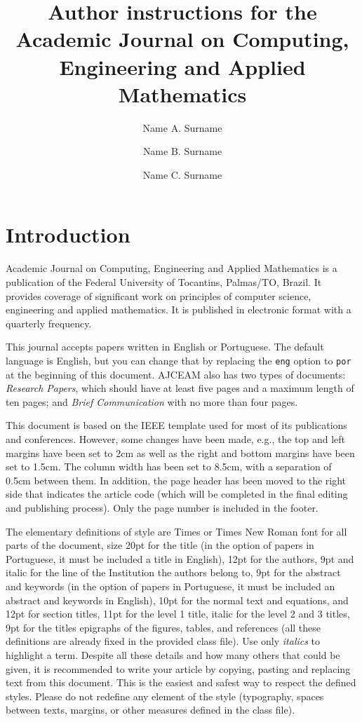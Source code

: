 \documentclass[eng]{ajceam-class}
\title{Author instructions for the Academic Journal on Computing, Engineering and Applied Mathematics}
\author[1]{Name A. Surname}
\author[2]{Name B. Surname}
\author[1,2,3]{Name C. Surname}
\affil[1]{University Name, Department Name or Institute, State, Country}
\affil[2]{(Other) University Name, Department Name or Institute, State, Country}
\affil[3]{(Other) University Name, Department Name or Institute, State, Country}
\begin{document}
\maketitle
\thispagestyle{fancy}
\printcontactdata

\section{Introduction}
Academic Journal on Computing, Engineering and Applied Mathematics is a publication of the Federal University of Tocantins, Palmas/TO, Brazil. It provides coverage of significant work on principles  of computer science, engineering and applied mathematics. It is published in electronic format with a quarterly frequency.

This journal accepts papers written in English or Portuguese. The default language is English, but you can change that by replacing the \texttt{eng} option to \texttt{por} at the beginning of this document. AJCEAM also has two types of documents: \textit{Research Papers}, which should have at least five pages and a maximum length of ten pages; and \textit{Brief Communication} with no more than four pages.

This document is based on the IEEE template used for most of its publications and conferences. However, some changes have been made, e.g., the top and left margins have been set to 2cm as well as the right and bottom margins have been set to 1.5cm. The column width has been set to 8.5cm, with a separation of 0.5cm between them. In addition, the page header has been moved to the right side that indicates the article code (which will be completed in the final editing and publishing process). Only the page number is included in the footer.

The elementary definitions of style are Times or Times New Roman font for all parts of the document, size 20pt for the title (in the option of papers in Portuguese, it must be included a title in English), 12pt for the authors, 9pt and italic for the line of the Institution the authors belong to, 9pt for the abstract and keywords (in the option of papers in Portuguese, it must be included an abstract and keywords in English), 10pt for the normal text and equations, and 12pt for section titles, 11pt for the level 1 title, italic for the level 2 and 3 titles, 9pt for the titles epigraphs of the figures, tables, and references (all these definitions are already fixed in the provided class file). Use only \emph{italics} to highlight a term. Despite all these details and how many others that could be given, it is recommended to write your article by copying, pasting and replacing text from this document. This is the easiest and safest way to respect the defined styles. Please do not redefine any element of the style (typography, spaces between texts, margins, or other measures defined in the class file).
\end{document}
